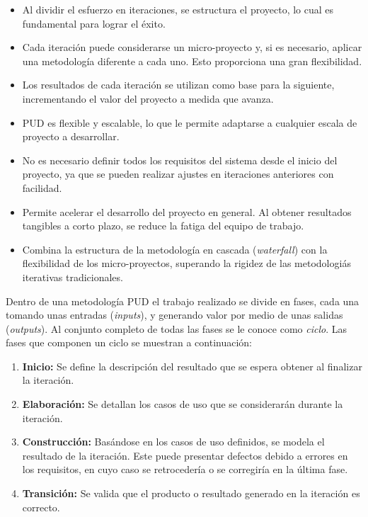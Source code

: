 \begin{itemize}
    \item Al dividir el esfuerzo en iteraciones, se estructura el proyecto, lo cual es fundamental para lograr el éxito.
    \item Cada iteración puede considerarse un micro-proyecto y, si es necesario, aplicar una metodología diferente a cada uno. Esto proporciona una gran flexibilidad.
    \item Los resultados de cada iteración se utilizan como base para la siguiente, incrementando el valor del proyecto a medida que avanza.
    \item \ac{PUD} es flexible y escalable, lo que le permite adaptarse a cualquier escala de proyecto a desarrollar.
    \item No es necesario definir todos los requisitos del sistema desde el inicio del proyecto, ya que se pueden realizar ajustes en iteraciones anteriores con facilidad.
    \item Permite acelerar el desarrollo del proyecto en general. Al obtener resultados tangibles a corto plazo, se reduce la fatiga del equipo de trabajo.
    \item Combina la estructura de la metodología en cascada (\textit{waterfall}) con la flexibilidad de los micro-proyectos, superando la rigidez de las metodologiás iterativas tradicionales.
\end{itemize}

Dentro de una metodología \ac{PUD} el trabajo realizado se divide en fases, cada una tomando unas entradas (\textit{inputs}), y generando valor por medio de unas salidas (\textit{outputs}). Al conjunto completo de todas las fases se le conoce como \textit{ciclo}. Las fases que componen un ciclo se muestran a continuación:

\begin{enumerate}
    \item \textbf{Inicio:} Se define la descripción del resultado que se espera obtener al finalizar la iteración.
    \item \textbf{Elaboración:} Se detallan los casos de uso que se considerarán durante la iteración.
    \item \textbf{Construcción:} Basándose en los casos de uso definidos, se modela el resultado de la iteración. Este puede presentar defectos debido a errores en los requisitos, en cuyo caso se retrocedería o se corregiría en la última fase.
    \item \textbf{Transición:} Se valida que el producto o resultado generado en la iteración es correcto.
\end{enumerate}

